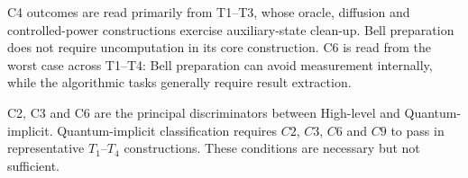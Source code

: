 C4 outcomes are read primarily from T1--T3, whose oracle, diffusion and controlled-power constructions exercise auxiliary-state clean-up.
Bell preparation does not require uncomputation in its core construction.
C6 is read from the worst case across T1--T4: Bell preparation can avoid measurement internally, while the algorithmic tasks generally require result extraction.

C2, C3 and C6 are the principal discriminators between High-level and Quantum-implicit.
Quantum-implicit classification requires $C2$, $C3$, $C6$ and $C9$ to pass in representative $T_1$--$T_4$ constructions.
These conditions are necessary but not sufficient.
